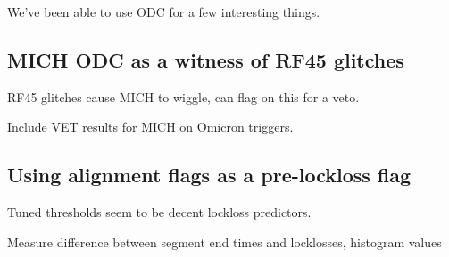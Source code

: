 We've been able to use ODC for a few interesting things.

\subsection{MICH ODC as a witness of RF45 glitches}

RF45 glitches cause MICH to wiggle, can flag on this for a veto. 

Include VET results for MICH on Omicron triggers.

\subsection{Using alignment flags as a pre-lockloss flag}

Tuned thresholds seem to be decent lockloss predictors.

Measure difference between segment end times and locklosses, histogram values


